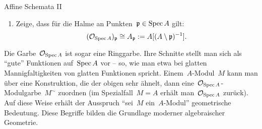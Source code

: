 \documentclass{uebblatt}
\begin{document}
\begin{aufgabe}{Affine Schemata II}
\begin{enumerate}
\item Zeige, dass für die Halme an Punkten~$\mathfrak{p} \in \operatorname{Spec} A$ gilt:
\[ (\mathcal{O}_{\operatorname{Spec} A})_{\mathfrak{p}} \cong A_{\mathfrak{p}} := A[(A \setminus \mathfrak{p})^{-1}]. \]
\end{enumerate}

{\scriptsize
Die Garbe~$\mathcal{O}_{\operatorname{Spec} A}$ ist sogar eine Ringgarbe. Ihre Schnitte stellt man
sich als "`gute"' Funktionen auf~$\operatorname{Spec} A$ vor -- so, wie man etwa bei glatten
Mannigfaltigkeiten von glatten Funktionen spricht. Einem~$A$-Modul~$M$ kann man
über eine Konstruktion, die der obigen sehr ähnelt, dann eine~$\mathcal{O}_{\operatorname{Spec}
A}$-Modulgarbe~$M^\sim$ zuordnen (im Spezialfall~$M = A$ erhält man~$\mathcal{O}_{\operatorname{Spec}
A}$ zurück). Auf diese Weise erhält der Ausspruch "`sei~$M$ ein~$A$-Modul"'
geometrische Bedeutung. Diese Begriffe bilden die Grundlage moderner
algebraischer Geometrie.\par}
\end{aufgabe}
\end{document}
